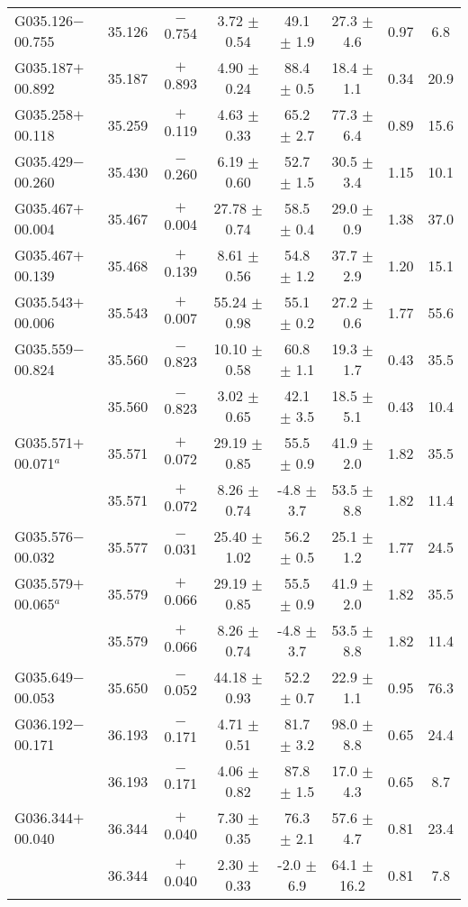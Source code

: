 \begin{ThreePartTable}
\begin{longtable}{lccccccc}
G035.126$-$00.755     &35.126&	$-$0.754	&3.72	$\pm$ 0.54	&49.1	$\pm$ 1.9	&27.3	$\pm$ 4.6	&0.97	&6.8\\
G035.187$+$00.892     &35.187&	$+$0.893	&4.90	$\pm$ 0.24	&88.4	$\pm$ 0.5	&18.4	$\pm$ 1.1	&0.34	&20.9\\
G035.258$+$00.118     &35.259&	$+$0.119	&4.63	$\pm$ 0.33	&65.2	$\pm$ 2.7	&77.3	$\pm$ 6.4	&0.89	&15.6\\
G035.429$-$00.260     &35.430&	$-$0.260	&6.19	$\pm$ 0.60	&52.7	$\pm$ 1.5	&30.5	$\pm$ 3.4	&1.15	&10.1\\
G035.467$+$00.004     &35.467&	$+$0.004	&27.78	$\pm$ 0.74	&58.5	$\pm$ 0.4	&29.0	$\pm$ 0.9	&1.38	&37.0\\
G035.467$+$00.139     &35.468&	$+$0.139	&8.61	$\pm$ 0.56	&54.8	$\pm$ 1.2	&37.7	$\pm$ 2.9	&1.20	&15.1\\
G035.543$+$00.006     &35.543&	$+$0.007	&55.24	$\pm$ 0.98	&55.1	$\pm$ 0.2	&27.2	$\pm$ 0.6	&1.77	&55.6\\
G035.559$-$00.824     &35.560&	$-$0.823	&10.10	$\pm$ 0.58	&60.8	$\pm$ 1.1	&19.3	$\pm$ 1.7	&0.43	&35.5\\
                      &35.560&	$-$0.823	&3.02	$\pm$ 0.65	&42.1	$\pm$ 3.5	&18.5	$\pm$ 5.1	&0.43	&10.4\\
G035.571$+$00.071$^a$ &35.571&	$+$0.072	&29.19	$\pm$ 0.85	&55.5	$\pm$ 0.9	&41.9	$\pm$ 2.0	&1.82	&35.5\\
                      &35.571&	$+$0.072	&8.26	$\pm$ 0.74	&-4.8	$\pm$ 3.7	&53.5	$\pm$ 8.8	&1.82	&11.4\\
G035.576$-$00.032     &35.577&	$-$0.031	&25.40	$\pm$ 1.02	&56.2	$\pm$ 0.5	&25.1	$\pm$ 1.2	&1.77	&24.5\\
G035.579$+$00.065$^a$ &35.579&	$+$0.066	&29.19	$\pm$ 0.85	&55.5	$\pm$ 0.9	&41.9	$\pm$ 2.0	&1.82	&35.5\\
                      &35.579&	$+$0.066	&8.26	$\pm$ 0.74	&-4.8	$\pm$ 3.7	&53.5	$\pm$ 8.8	&1.82	&11.4\\
G035.649$-$00.053     &35.650&	$-$0.052	&44.18	$\pm$ 0.93	&52.2	$\pm$ 0.7	&22.9	$\pm$ 1.1	&0.95	&76.3\\
G036.192$-$00.171     &36.193&	$-$0.171	&4.71	$\pm$ 0.51	&81.7	$\pm$ 3.2	&98.0	$\pm$ 8.8	&0.65	&24.4\\
                      &36.193&	$-$0.171	&4.06	$\pm$ 0.82	&87.8	$\pm$ 1.5	&17.0	$\pm$ 4.3	&0.65	&8.7\\
G036.344$+$00.040     &36.344&	$+$0.040	&7.30	$\pm$ 0.35	&76.3	$\pm$ 2.1	&57.6	$\pm$ 4.7	&0.81	&23.4\\
                      &36.344&	$+$0.040	&2.30	$\pm$ 0.33	&-2.0	$\pm$ 6.9	&64.1	$\pm$ 16.2	&0.81	&7.8\\

\end{longtable}
\end{ThreePartTable}
